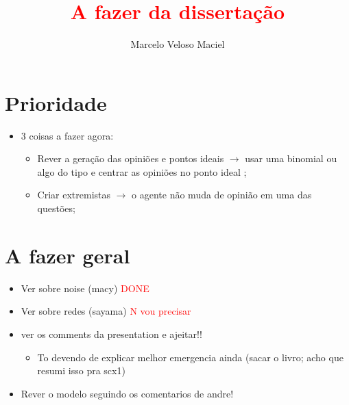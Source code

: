 \documentclass{article}
\title{\textcolor{red}{A fazer da dissertação}}
\author{Marcelo Veloso Maciel}
\date{}
\begin{document}
\pagecolor{base03}
\color{base1}

\maketitle


\section*{Prioridade}
\begin{itemize}
\item 3 coisas a fazer agora:
  \begin{itemize}
  \item Rever a geração das opiniões e pontos ideais \(\rightarrow\) usar uma binomial ou
    algo do tipo e centrar as opiniões no ponto ideal ;
  \item Criar extremistas \(\rightarrow\) o agente não muda de opinião em uma das
    questões; 
  \end{itemize}
\end{itemize}

\section*{A fazer geral}
\begin{itemize}
  \item Ver sobre noise (macy) \textcolor{red}{DONE}
  \item Ver sobre redes (sayama)  \textcolor{red}{N vou precisar}
  \item ver os comments da presentation e ajeitar!!
    \begin{itemize}
    \item To devendo de explicar melhor emergencia ainda (sacar o livro; acho
      que resumi isso pra scx1)
    \end{itemize}
  \item Rever o modelo seguindo os comentarios de andre!


\end{itemize}
\end{document}
